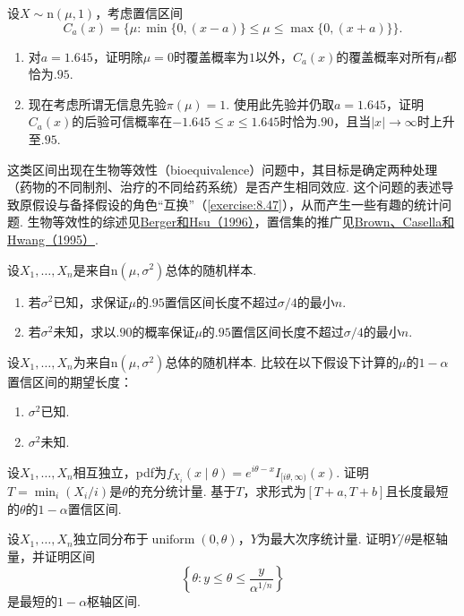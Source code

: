 \begin{exercise}\label{exercise:9.33}
设$X\sim\mathrm n(\mu,1)$，考虑置信区间
$$C_a(x)=\{\mu:\min\{0,(x-a)\}\le\mu\le\max\{0,(x+a)\}\}.$$
\begin{enumerate}
\item 对$a=1.645$，证明除$\mu=0$时覆盖概率为$1$以外，$C_a(x)$的覆盖概率对所有$\mu$都恰为$.95$.
\item 现在考虑所谓无信息先验$\pi(\mu)=1$. 使用此先验并仍取$a=1.645$，证明$C_a(x)$的后验可信概率在$-1.645\le x\le1.645$时恰为$.90$，且当$|x|\to\infty$时上升至$.95$.
\end{enumerate}
这类区间出现在生物等效性（bioequivalence）问题中，其目标是确定两种处理（药物的不同制剂、治疗的不同给药系统）是否产生相同效应. 这个问题的表述导致原假设与备择假设的角色“互换”（\autoref{exercise:8.47}），从而产生一些有趣的统计问题. 生物等效性的综述见\hyperref[bib:source27]{Berger和Hsu（1996）}，置信集的推广见\hyperref[bib:source53]{Brown、Casella和Hwang（1995）}.
\end{exercise}
\begin{exercise}\label{exercise:9.34}
设$X_1,\ldots,X_n$是来自$\mathrm n(\mu,\sigma^2)$总体的随机样本.
\begin{enumerate}
\item 若$\sigma^2$已知，求保证$\mu$的$.95$置信区间长度不超过$\sigma/4$的最小$n$.
\item 若$\sigma^2$未知，求以$.90$的概率保证$\mu$的$.95$置信区间长度不超过$\sigma/4$的最小$n$.
\end{enumerate}
\end{exercise}
\begin{exercise}\label{exercise:9.35}
设$X_1,\ldots,X_n$为来自$\mathrm n(\mu,\sigma^2)$总体的随机样本. 比较在以下假设下计算的$\mu$的$1-\alpha$置信区间的期望长度：
\begin{enumerate}
\item $\sigma^2$已知.
\item $\sigma^2$未知.
\end{enumerate}
\end{exercise}
\begin{exercise}\label{exercise:9.36}
设$X_1,\ldots,X_n$相互独立，pdf为$f_{X_i}(x\mid\theta)=e^{i\theta-x}I_{[i\theta,\infty)}(x)$. 证明$T=\min_i(X_i/i)$是$\theta$的充分统计量. 基于$T$，求形式为$[T+a,T+b]$且长度最短的$\theta$的$1-\alpha$置信区间.
\end{exercise}
\begin{exercise}\label{exercise:9.37}
设$X_1,\ldots,X_n$独立同分布于$\operatorname{uniform}(0,\theta)$，$Y$为最大次序统计量. 证明$Y/\theta$是枢轴量，并证明区间
$$\left\{\theta:y\le\theta\le\frac y{\alpha^{1/n}}\right\}$$
是最短的$1-\alpha$枢轴区间.
\end{exercise}
